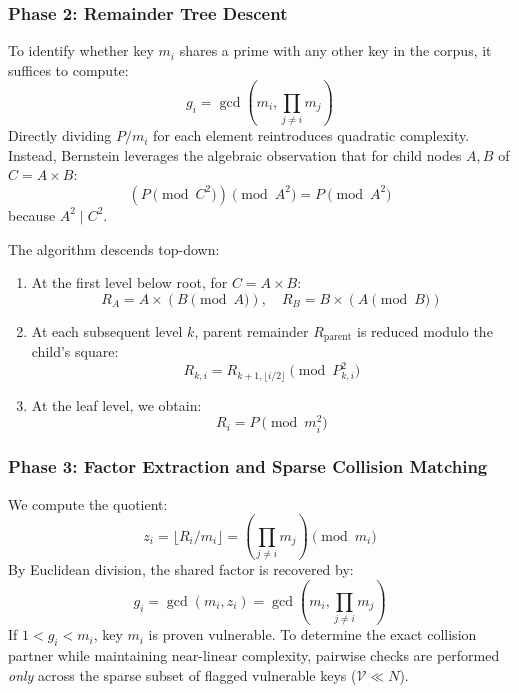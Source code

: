 \documentclass[sigconf,nonacm]{acmart}
\begin{document}
\subsubsection{Phase 2: Remainder Tree Descent}
To identify whether key $m_i$ shares a prime with any other key in the corpus, it suffices to compute:
\begin{equation}
g_i = \gcd\left(m_i, \prod_{j \ne i} m_j\right)
\end{equation}
Directly dividing $P / m_i$ for each element reintroduces quadratic complexity. Instead, Bernstein leverages the algebraic observation that for child nodes $A, B$ of $C = A \times B$:
\begin{equation}
(P \pmod{C^2}) \pmod{A^2} = P \pmod{A^2}
\end{equation}
because $A^2 \mid C^2$. 

The algorithm descends top-down:
\begin{enumerate}
    \item At the first level below root, for $C = A \times B$:
    \begin{equation}
    R_A = A \times (B \pmod A), \quad R_B = B \times (A \pmod B)
    \end{equation}
    \item At each subsequent level $k$, parent remainder $R_{\text{parent}}$ is reduced modulo the child's square:
    \begin{equation}
    R_{k, i} = R_{k+1, \lfloor i/2 \rfloor} \pmod{P_{k, i}^2}
    \end{equation}
    \item At the leaf level, we obtain:
    \begin{equation}
    R_i = P \pmod{m_i^2}
    \end{equation}
\end{enumerate}

\subsubsection{Phase 3: Factor Extraction and Sparse Collision Matching}
We compute the quotient:
\begin{equation}
z_i = \lfloor R_i / m_i \rfloor = \left(\prod_{j \ne i} m_j\right) \pmod{m_i}
\end{equation}
By Euclidean division, the shared factor is recovered by:
\begin{equation}
g_i = \gcd(m_i, z_i) = \gcd\left(m_i, \prod_{j \ne i} m_j\right)
\end{equation}
If $1 < g_i < m_i$, key $m_i$ is proven vulnerable. To determine the exact collision partner while maintaining near-linear complexity, pairwise checks are performed \textit{only} across the sparse subset of flagged vulnerable keys ($\mathcal{V} \ll N$).
\end{document}
